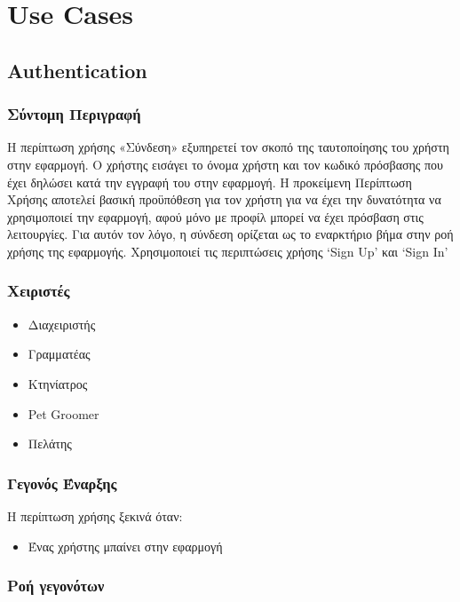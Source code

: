 \documentclass[12pt,a4paper,twoside]{book}
\renewcommand{\headrulewidth}{0pt} %
\renewcommand{\headrulewidth}{0pt}
\let\oldtableofcontents\tableofcontents
\renewcommand{\tableofcontents}{%
    \clearpage
    \thispagestyle{empty}
    \pagestyle{tocstyle}
    \oldtableofcontents %
    \clearpage
    \pagestyle{fancy}
    \fancyhead[LE]{\thepage} %
    \fancyhead[CE]{\leftmark} %
    \fancyhead[RE]{ΚΕΦ. \thechapter} %

    \fancyhead[LO]{\thesection} %
    \fancyhead[CO]{\rightmark} %
    \fancyhead[RO]{\thepage} %

    \renewcommand{\headrulewidth}{0.4pt} %

    \renewcommand{\chaptermark}[1]{\markboth{##1}{}}
    \renewcommand{\sectionmark}[1]{\markright{##1}}
}
\begin{document}
\tableofcontents

\printindex

\chapter{Use Cases}

\section{Authentication}

\subsection{Σύντομη Περιγραφή}
Η περίπτωση χρήσης «Σύνδεση» εξυπηρετεί τον σκοπό της ταυτοποίησης του χρήστη στην εφαρμογή. Ο χρήστης εισάγει το όνομα χρήστη και τον κωδικό πρόσβασης που έχει δηλώσει κατά την εγγραφή του στην εφαρμογή. Η προκείμενη Περίπτωση Χρήσης αποτελεί βασική προϋπόθεση για τον χρήστη για να έχει την δυνατότητα να χρησιμοποιεί την εφαρμογή, αφού μόνο με προφίλ μπορεί να έχει πρόσβαση στις λειτουργίες. Για αυτόν τον λόγο, η σύνδεση ορίζεται ως το εναρκτήριο βήμα στην ροή χρήσης της εφαρμογής. Χρησιμοποιεί τις περιπτώσεις χρήσης `Sign Up' και `Sign In' %

\subsection{Χειριστές}
\begin{itemize}
  \item Διαχειριστής
  \item Γραμματέας
  \item Κτηνίατρος
  \item Pet Groomer
  \item Πελάτης
\end{itemize}

\subsection{Γεγονός Έναρξης}
Η περίπτωση χρήσης ξεκινά όταν:
\begin{itemize}
  \item Ένας χρήστης μπαίνει στην εφαρμογή
\end{itemize}

\subsection{Ροή γεγονότων}
\end{document}

